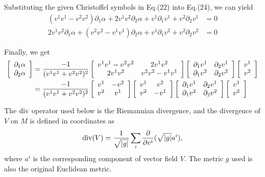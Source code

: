 \documentclass{article}
\theoremstyle{definition}
\theoremstyle{plain}
\begin{document}
Substituting the given Christoffel symbols in Eq.(22) into Eq.(24), we can yield 
\begin{align}
	\left(v^1v^1 - v^2v^2\right)\partial_1\alpha + 2v^1v^2\partial_2\alpha+v^1\partial_1v^1 + v^2\partial_2v^1 &= 0\\ \nonumber
	2v^1v^2\partial_1\alpha +\left(v^2v^2 - v^1v^1\right)\partial_2\alpha+v^1\partial_1v^2+v^2\partial_2v^2&= 0
\end{align}

Finally, we get
\begin{align}
	\left[\begin{array}{c}
	\partial_1\alpha\\
	\partial_2\alpha
	\end{array}\right]&= \frac{-1}{(v^1v^1 + v^2v^2)^2}
	\left[\begin{array}{cc}
	v^1v^1 - v^2v^2 & 2v^1v^2\\
	2v^1v^2 & v^2v^2-v^1v^1
	\end{array}\right]
	\left[\begin{array}{cc}
	\partial_1v^1 & \partial_2v^1\\
	\partial_1v^2 & \partial_2v^2
	\end{array}\right]
	\left[\begin{array}{c}
	v^1\\
	v^2
	\end{array}\right]\notag\\
	&=\frac{-1}{(v^1v^1 + v^2v^2)^2}
	\left[\begin{array}{cc}
	v^1  & -v^2\\
	v^2 & v^1
	\end{array}\right]
	\left[\begin{array}{cc}
	v^1  & v^2\\
	v^2 & -v^1
	\end{array}\right]
	\left[\begin{array}{cc}
	\partial_1v^1 & \partial_2v^1\\
	\partial_1v^2 & \partial_2v^2
	\end{array}\right]
	\left[\begin{array}{c}
	v^1\\
	v^2
	\end{array}\right]
\end{align}

The ${\rm div}$ operator used below is the Riemannian divergence, and the divergence of $V$ on $M$ is defined in coordinates as
\begin{equation}
    {\rm div}(V)=\frac{1}{\sqrt{|g|}}\sum_i\frac{\partial}{\partial v^i}(\sqrt{|g|}a^i),
\end{equation}
where $a^i$ is the corresponding component of vector field $V$. The metric $g$ used is also the original Euclidean metric.
\end{document}
